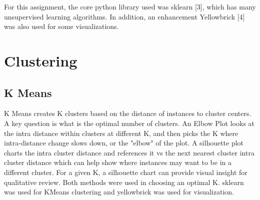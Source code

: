 \documentclass[letterpaper]{article} %
\begin{document}
For this assignment, the core python library used was sklearn [3], which has many unsupervised learning algorithms.  In addition, an enhancement Yellowbrick [4] was also used for some visualizations.


\section{Clustering}

\subsection{K Means}
K Means creates K clusters based on the distance of instances to cluster centers.  A key question is what is the optimal number of clusters.  An Elbow Plot looks at the intra distance within clusters at different K, and then picks the K where intra-distance change slows down, or the "elbow" of the plot.  A silhouette plot charts the  intra cluster distance and references it vs the next nearest cluster intra cluster distance which can help show where instances may want to be in a different cluster.   For a given K, a silhouette chart can provide visual insight for qualitative review.  Both methods were used in choosing an optimal K. sklearn was used for KMeans clustering and yellowbrick was used for visualization.
\end{document}
